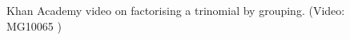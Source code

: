     \noindent
\label{m39394*eip-280}
    \setcounter{subfigure}{0}
	\begin{figure}[H] %
    \textnormal{Khan Academy video on factorising a trinomial by grouping.}\vspace{.1in} \nopagebreak
  \label{m39394*yt-media32}\label{m39394*yt-video32}
             { (Video:  MG10065 )}
      \vspace{2pt}
    \vspace{.1in}
 \end{figure}       \par \label{m39394*secfhsst!!!underscore!!!id2920}

